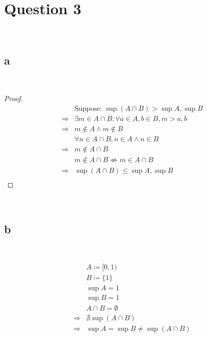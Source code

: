\documentclass{article}
\begin{document}
\newpage

~

\section*{Question 3}

~

\subsection*{a}

~

\begin{proof}
    \begin{align*}
        &\text{Suppose: }\sup(A\cap B)>\sup A,\sup B\\
        \Rightarrow&\exists m\in A\cap B:\forall a\in A,b\in B, m>a,b\\
        \Rightarrow&m\notin A\land m\notin B\\
        &\forall n\in A\cap B, n\in A\land n\in B\\
        \Rightarrow&m\notin A\cap B\\
        &m\notin A\cap B\nLeftrightarrow m\in A\cap B\\
        \Rightarrow&\sup(A\cap B)\leqslant\sup A,\sup B\\
    \end{align*}
\end{proof}

~

\subsection*{b}

~

\begin{align*}
    &A\coloneqq [0,1)\\
    &B\coloneqq \{1\}\\
    &\sup A=1\\
    &\sup B=1\\
    &A\cap B=\emptyset\\
    \Rightarrow&\nexists \sup(A\cap B)\\
    \Rightarrow&\sup A=\sup B\ne \sup(A\cap B)\\
\end{align*}
\end{document}
